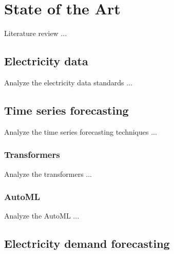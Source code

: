 \chapter{State of the Art}
\label{cha:soa}
\vspace{0.4 cm}

Literature review ...


\section{Electricity data}
\label{sec:data}
\vspace{0.2 cm}

Analyze the electricity data standards ...
\cite{CHEN201798}
\cite{8577770}
\cite{8284772}
\cite{5772503}


\section{Time series forecasting}
\label{sec:timeseries}
\vspace{0.2 cm}

Analyze the time series forecasting techniques ...
\cite{DEGOOIJER2006443}
\cite{SMYL202075}
\cite{Lim2021}
\cite{ZHANG2003159}
\cite{Nesreen2010}
\cite{SEZER2020106181}
\cite{en16031371}
\cite{HEWAMALAGE2021388}
\cite{BENTAIEB20127067}
\cite{CAO2003321}
\cite{LI2019104785}
\cite{DU2020269}
\cite{Sean2017}
\cite{Masini2023}
\cite{Borovykh2017}
\cite{SHEN2020302}
\cite{DEOSANTOSJUNIOR201972}
\cite{Athiyarath2020}
\cite{Cerqueira2020}
\cite{6210391}
\cite{TEALAB2018334}
\cite{Oliveira2015}


\vspace{0.1 cm}
\subsection{Transformers}
\label{sec:transformers}
\vspace{0.1 cm}

Analyze the transformers ...


\vspace{0.1 cm}
\subsection{AutoML}
\label{sec:automl}
\vspace{0.1 cm}

Analyze the AutoML ...


\section{Electricity demand forecasting}
\label{sec:demandsoa}
\vspace{0.2 cm}

